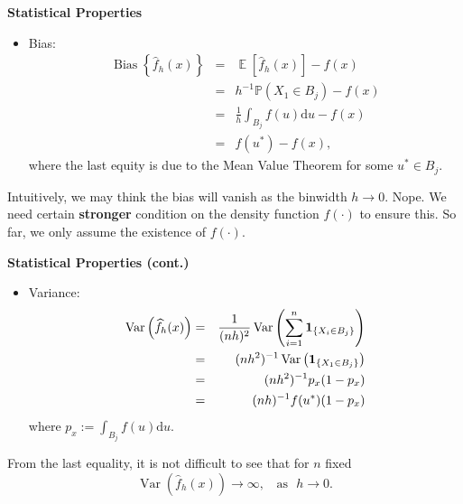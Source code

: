 \documentclass[19pt,landscaoe]{article}
\newcommand{\IP}{\mathbb{P}}
\newcommand{\bone}{{\bf 1}}
\DeclareMathOperator{\E}{\mathbb{E}}
\DeclareMathOperator{\var}{\mathrm{Var}}
\DeclareMathOperator{\bs}{\mathrm{Bias}}
\begin{document}


\newpage
{\LARGE\centerline{\textbf{Statistical Properties}}}
\vskip25pt
\begin{minipage}{.9\textwidth}
    \Large
    \begin{itemize}
        \item Bias: 
        \begin{eqnarray}
            \bs\left\{\widehat{f}_h(x)\right\}&=&\E\left[\widehat{f}_h(x)\right]-f(x)\nonumber\\
            &=&h^{-1}\IP\left(X_1\in B_j\right)-f(x)\nonumber\\
            &=&\frac1h\int_{B_j}f(u)\mathrm{d}u-f(x)\nonumber\\
            &=&f(u^*)-f(x),\label{bs-mvt}
        \end{eqnarray}
        where the last equity is due to the Mean Value Theorem for some $u^*\in B_j$. 
    \end{itemize}
Intuitively, we may think the bias will vanish as the binwidth $h\to0$. Nope. We need certain {\bf stronger} condition on the density function $f(\cdot)$ to ensure this. So far, we only assume the existence of $f(\cdot)$.
\end{minipage}

\newpage
{\LARGE\centerline{\textbf{Statistical Properties (cont.)}}}
\vskip25pt
\begin{minipage}{.9\textwidth}
    \Large
    \begin{itemize}
        \item Variance:
        \begin{eqnarray}
            \var\left(\widehat{f}_h(x)\right)&=&\frac1{(nh)^2}\var\left(\sum_{i=1}^n\bone_{\{X_i\in B_j\}}\right)\nonumber\\
            &=&(nh^2)^{-1}\var\left(\bone_{\{X_1\in B_j\}}\right)\nonumber\\
            &=&(nh^2)^{-1}p_x(1-p_x)\\
            &=&(nh)^{-1}f(u^*)(1-p_x)\label{var-bound1}
        \end{eqnarray}
        where $p_x:=\int_{B_j}f(u)\mathrm{d}u$.
    \end{itemize}
From the last equality, it is not difficult to see that for $n$ fixed 
$$\var\left(\widehat{f}_h(x)\right)\to\infty,~~~~\mathrm{as}~~~h\to0.$$ 
\end{minipage}
\end{document}
